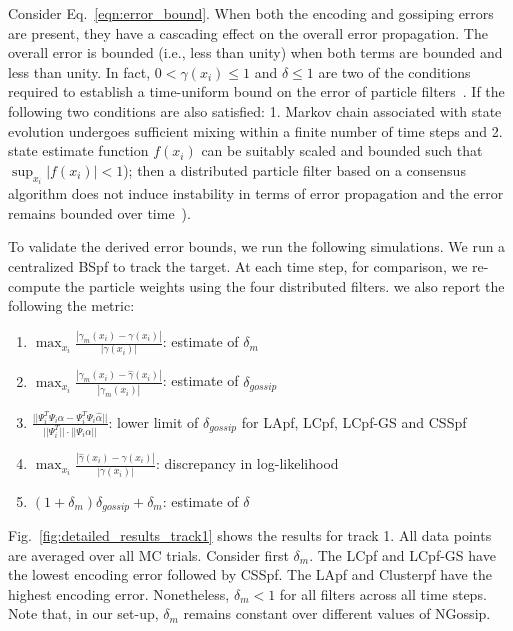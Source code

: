 \documentclass[10pt,letterpaper,final]{article}
\begin{document}
Consider Eq.~\eqref{eqn:error_bound}. When both the encoding and gossiping errors are present, they have a cascading effect on the overall error propagation. The overall error is bounded (i.e., less than unity) when both terms are bounded and less than unity. In fact, $0<\gamma(x_i)\leq 1$ and $\delta\leq 1$ are two of the conditions required to establish a time-uniform bound on the error of particle filters~\cite{Syamantak2015}. If the following two conditions are also satisfied: 1. Markov chain associated with state evolution undergoes sufficient mixing within a finite number of time steps and 2. state estimate function $f(x_i)$ can be suitably scaled and bounded such that $\sup_{x_i} |f(x_i)|<1$); then a distributed particle filter based on a consensus algorithm does not induce instability in terms of error propagation and the error remains bounded over time~\cite{Syamantak2015}).

To validate the derived error bounds, we run the following simulations. We run a centralized BSpf to track the target. At each time step, for comparison, we re-compute the particle weights using the four distributed filters. we also report the following the metric:
\begin{enumerate}
\item $\max_{x_i} \frac{|\gamma_{m}(x_i)-\gamma(x_i)|}{|\gamma(x_i)|}$: estimate of $\delta_m$
\item $\max_{x_i} \frac{|\gamma_m(x_i)-\hat{\gamma}(x_i)|}{|\gamma_m(x_i)|}$: estimate of $\delta_{gossip}$ 
\item $\frac{||\Psi_i^T\Psi_i\alpha-\Psi_i^T\Psi_i\hat{\alpha}||}{||\Psi_i^T||\cdot ||\Psi_i\alpha||}$: lower limit of $\delta_{gossip}$ for LApf, LCpf, LCpf-GS and CSSpf
\item $\max_{x_i} \frac{|\hat{\gamma}(x_i) - \gamma(x_i)|}{|\gamma(x_i)|}$: discrepancy in log-likelihood
\item $(1+\delta_m)\delta_{gossip} + \delta_m$: estimate of $\delta$
\end{enumerate}

Fig.~\ref{fig:detailed_results_track1} shows the results for track 1. All data points are averaged over all MC trials. Consider first $\delta_m$. The LCpf and LCpf-GS have the lowest encoding error followed by CSSpf. The LApf and Clusterpf have the highest encoding error. Nonetheless, $\delta_m<1$ for all filters across all time steps. Note that, in our set-up, $\delta_m$ remains constant over different values of NGossip.
\end{document}
